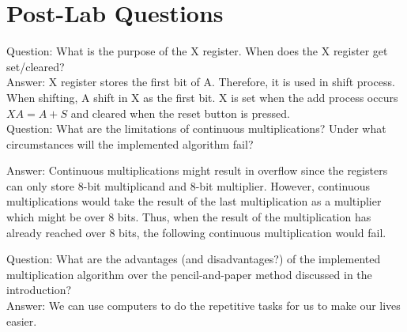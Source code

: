 \documentclass[12pt]{article}
\begin{document}
\section{Post-Lab Questions}
Question: What is the purpose of the X register. When does the X register get set/cleared? \\

Answer: X register stores the first bit of A. Therefore, it is used in shift process. When shifting, A shift in X as the first bit. X is set when the add process occurs $XA=A+S$ and cleared when the reset button is pressed. \\

Question: What are the limitations of continuous multiplications? Under what circumstances
will the implemented algorithm fail?

Answer: Continuous multiplications might result in overflow since the registers can only store 8-bit multiplicand and 8-bit multiplier. However, continuous multiplications would take the result of the last multiplication as a multiplier which might be over 8 bits. Thus, when the result of the multiplication has already reached over 8 bits, the following continuous multiplication would fail.

Question: What are the advantages (and disadvantages?) of the implemented multiplication algorithm over the pencil-and-paper method discussed in the introduction? \\

Answer: We can use computers to do the repetitive tasks for us to make our lives easier. \\

\begin{table}[H]
    \centering
    \caption{Design statistics table for the multiplier.}
\end{table}
\end{document}
